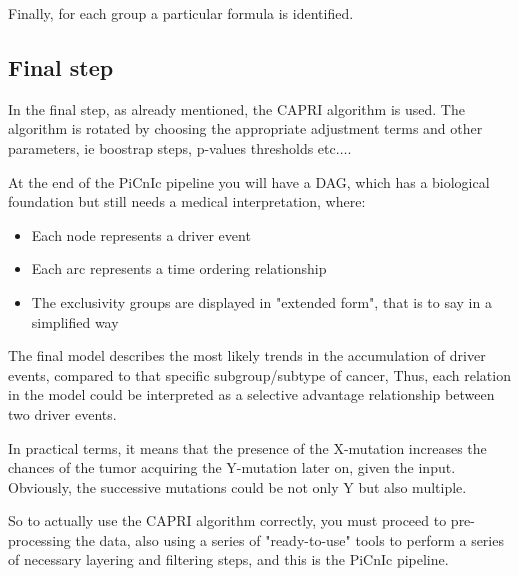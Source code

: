 Finally, for each group a particular formula is identified.
\subsection{Final step}
In the final step, as already mentioned, the CAPRI algorithm is used. The algorithm
is rotated by choosing the appropriate adjustment terms and other parameters, ie
boostrap steps, p-values thresholds etc$\dots$.

At the end of the PiCnIc pipeline you will have a DAG, which has a biological
foundation but still needs a medical interpretation, where:
\begin{itemize}
    \item Each node represents a driver event
    \item Each arc represents a time ordering relationship
    \item The exclusivity groups are displayed in "extended form", that is to say
          in a simplified way
\end{itemize}

The final model describes the most likely trends in the accumulation of driver 
events, compared to that specific subgroup/subtype of cancer, Thus, each relation 
in the model could be interpreted as a selective advantage relationship between 
two driver events.

In practical terms, it means that the presence of the X-mutation increases the 
chances of the tumor acquiring the Y-mutation later on, given the input. Obviously, 
the successive mutations could be not only Y but also multiple.

So to actually use the CAPRI algorithm correctly, you must proceed to pre-processing 
the data, also using a series of "ready-to-use" tools to perform a series of 
necessary layering and filtering steps, and this is the PiCnIc pipeline.